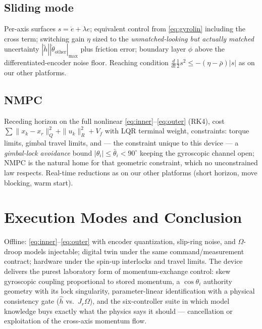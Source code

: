\documentclass[conference]{IEEEtran}
\begin{document}
\subsection{Sliding mode}
Per-axis surfaces $s = \dot e + \lambda e$; equivalent control from \eqref{eq:gyrolin} including the cross term; switching gain $\eta$ sized to the \emph{unmatched-looking but actually matched} uncertainty $|\tilde h||\dot\theta_{\mathrm{other}}|_{\max}$ plus friction error; boundary layer $\phi$ above the differentiated-encoder noise floor. Reaching condition $\tfrac{d}{dt}\tfrac12 s^2 \le -(\eta - \bar\rho)|s|$ as on our other platforms.

\subsection{NMPC}
Receding horizon on the full nonlinear \eqref{eq:inner}--\eqref{eq:outer} (RK4), cost $\sum \|x_k - x_r\|_Q^2 + \|u_k\|_R^2 + V_f$ with LQR terminal weight, constraints: torque limits, gimbal travel limits, and --- the constraint unique to this device --- a \emph{gimbal-lock avoidance} bound $|\theta_i| \le \bar\theta_i < 90^\circ$ keeping the gyroscopic channel open; NMPC is the natural home for that geometric constraint, which no unconstrained law respects. Real-time reductions as on our other platforms (short horizon, move blocking, warm start).

\section{Execution Modes and Conclusion}
Offline: \eqref{eq:inner}--\eqref{eq:outer} with encoder quantization, slip-ring noise, and $\Omega$-droop models injectable; digital twin under the same command/measurement contract; hardware under the spin-up interlocks and travel limits. The device delivers the purest laboratory form of momentum-exchange control: skew gyroscopic coupling proportional to stored momentum, a $\cos\theta_i$ authority geometry with its lock singularity, parameter-linear identification with a physical consistency gate ($\hat h$ vs.\ $J_r\Omega$), and the six-controller suite in which model knowledge buys exactly what the physics says it should --- cancellation or exploitation of the cross-axis momentum flow.
\end{document}
